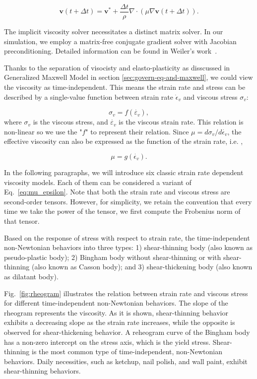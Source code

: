 \documentclass[10pt,journal,compsoc]{IEEEtran}
\begin{document}
\begin{equation}
	\mathbf{v}(t+\Delta t)=\mathbf{v}^*+\frac{\Delta t}{\rho}  \nabla\cdot(\mu \nabla \mathbf{v}(t+\Delta t)).
\end{equation}

The implicit viscosity solver necessitates a distinct matrix solver. In our simulation, we employ a matrix-free conjugate gradient solver with Jacobian preconditioning. Detailed information can be found in Weiler's work~\cite{Weiler2018-viscosity}.


Thanks to the separation of visocisty and elasto-plasticity as disscussed in Generalized Maxwell Model in section \ref{sec:govern-eq-and-maxwell}, we could view the viscosity as time-independent. This means the strain rate and stress can be described by a single-value function between strain rate $\dot\epsilon_v$ and viscous stress $\sigma_v$:

\begin{equation}
	\sigma_v=f\left(\dot{\varepsilon_v}\right),
\end{equation}
where $\sigma_v$ is the viscous stress, and $\dot{\varepsilon_v}$ is the viscous strain rate. This relation is non-linear so we use the "$f$" to represent their relation.
Since $\mu=d\sigma_v /d\dot{\epsilon_v}$, the effective viscosity can also be expressed as the function of the strain rate, i.e. ,


\begin{equation}
	\mu=g\left(\dot{\epsilon_v}\right). \label{eq:mu_epsilon}
\end{equation}


In the following paragraphs, we will introduce six classic strain rate dependent viscosity models. Each of them can be considered a variant of Eq.~\ref{eq:mu_epsilon}. Note that both the strain rate and viscous stress are second-order tensors. However, for simplicity, we retain the convention that every time we take the power of the tensor, we first compute the Frobenius norm of that tensor.


Based on the response of stress with respect to strain rate, the time-independent non-Newtonian behaviors into three types: 1) shear-thinning body (also known as pseudo-plastic body); 2) Bingham body without shear-thinning or with shear-thinning (also known as Casson body); and 3) shear-thickening body (also known as dilatant body).


Fig.~\ref{fig:rheogram} illustrates the relation between strain rate and viscous stress for different time-independent non-Newtonian behaviors. The slope of the rheogram represents the viscosity. As it is shown, shear-thinning behavior exhibits a decreasing slope as the strain rate increases, while the opposite is observed for shear-thickening behavior. A reheogram curve of the Bingham body has a non-zero intercept on the stress axis, which is the yield stress. Shear-thinning is the most common type of time-independent, non-Newtonian behaviors. Daily necessities, such as ketchup, nail polish, and wall paint, exhibit shear-thinning behaviors.
\end{document}
